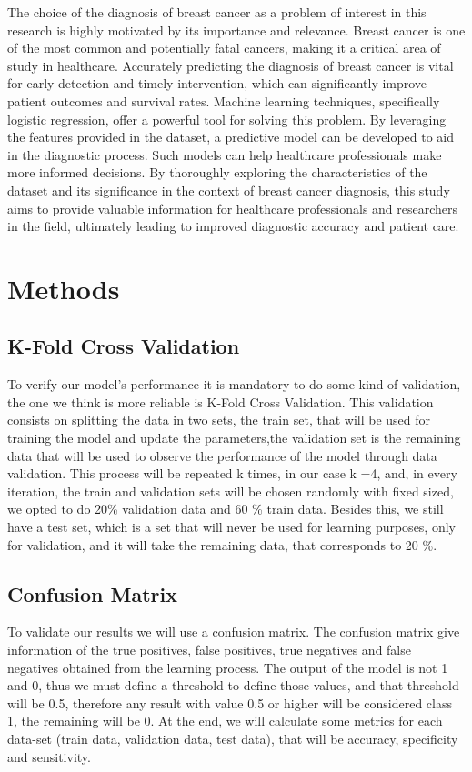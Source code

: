 \documentclass[12pt,a4paper,twocolumn]{article}
\begin{document}
The choice of the diagnosis of breast cancer as a problem of interest in this research is highly motivated by its importance and relevance. Breast cancer is one of the most common and potentially fatal cancers, making it a critical area of study in healthcare. Accurately predicting the diagnosis of breast cancer is vital for early detection and timely intervention, which can significantly improve patient outcomes and survival rates. Machine learning techniques, specifically logistic regression, offer a powerful tool for solving this problem. By leveraging the features provided in the dataset, a predictive model can be developed to aid in the diagnostic process. Such models can help healthcare professionals make more informed decisions. By thoroughly exploring the characteristics of the dataset and its significance in the context of breast cancer diagnosis, this study aims to provide valuable information for healthcare professionals and researchers in the field, ultimately leading to improved diagnostic accuracy and patient care. 

\section{Methods}
\subsection{K-Fold Cross Validation}
\par To verify our model's performance it is mandatory to do some kind of validation, the one we think is more reliable is K-Fold Cross Validation. This validation consists on splitting the data in two sets, the train set, that will be used for training the model and update the parameters,the validation set is the remaining data that will be used to observe the performance of the model through data validation. This process will be repeated k times, in our case k =4, and, in every iteration, the train and validation sets will be chosen randomly with fixed sized, we opted to do 20\% validation data and 60 \% train data. Besides this, we still have a test set, which is a set that will never be used for learning purposes, only for validation, and it will take the remaining data, that corresponds to 20 \%.

\subsection{Confusion Matrix}
\par To validate our results we will use a confusion matrix. The confusion matrix give information of the true positives, false positives, true negatives and false negatives  obtained from the learning process. The output of the model is not 1 and 0, thus we must define a threshold to define those values, and that threshold will be 0.5, therefore any result with value 0.5 or higher will be considered class 1, the remaining will be 0. At the end, we will calculate some metrics for each data-set (train data, validation data, test data), that will be accuracy, specificity and sensitivity.
\end{document}
